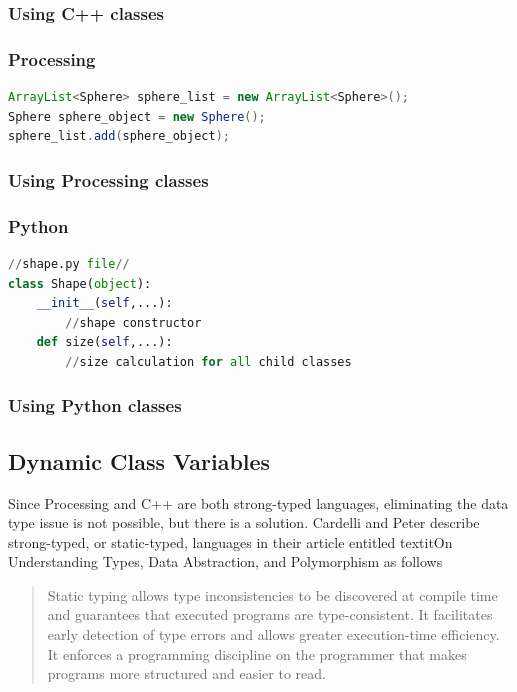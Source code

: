 \subsubsection{Using C++ classes}
\subsubsection{Processing}
\begin{lstlisting}[language=Java, caption=Java Class definition example, style=mystyle]
ArrayList<Sphere> sphere_list = new ArrayList<Sphere>();
Sphere sphere_object = new Sphere();
sphere_list.add(sphere_object);
\end{lstlisting}
\subsubsection{Using Processing classes}
\subsubsection{Python}
\begin{lstlisting}[language=Python, caption = Example of class definition in Python, style=mystyle]
//shape.py file//
class Shape(object):
    __init__(self,...):
        //shape constructor
    def size(self,...):
        //size calculation for all child classes
\end{lstlisting}
\subsubsection{Using Python classes}
\subsection{Dynamic Class Variables}
Since Processing and C++ are both strong-typed languages, eliminating the data type issue is not possible, but there is a solution.  Cardelli and Peter describe strong-typed, or static-typed, languages in their article entitled textit{On Understanding Types, Data Abstraction, and Polymorphism} as follows
\begin{quote}
Static typing allows type inconsistencies to be discovered at compile time and guarantees that executed programs are type-consistent. It facilitates early detection of type errors and allows greater execution-time efficiency. It enforces a programming discipline on the programmer that makes programs more structured and easier to read. \cite{cardelli1985understanding}
\end{quote}

